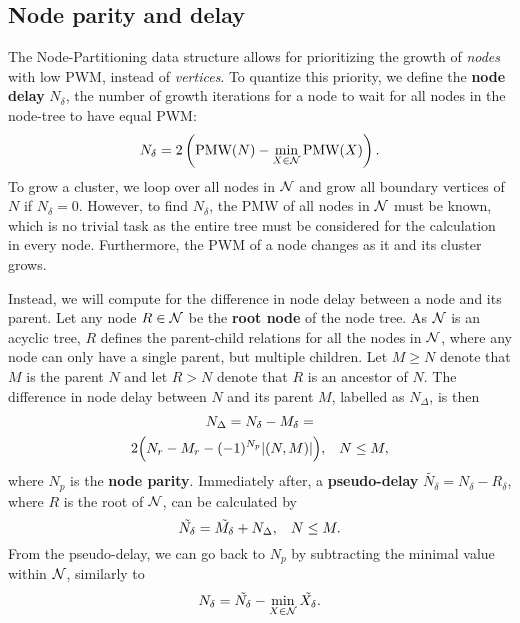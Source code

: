 \subsection{Node parity and delay}\label{sec:paritydelay}

The Node-Partitioning data structure allows for prioritizing the growth of \emph{nodes} with low PWM, instead of \emph{vertices}. To quantize this priority, we define the \textbf{node delay} $N_\delta$, the number of growth iterations for a node to wait for all nodes in the node-tree to have equal PWM: 
\begin{equation}
    N_\delta = 2\left(\text{PMW}(N) - \min_{X\in\mathcal{N}}{\text{PMW}(X)}\right).
\end{equation}
To grow a cluster, we loop over all nodes in $\mathcal{N}$ and grow all boundary vertices of $N$ if $N_\delta=0$. However, to find $N_\delta$, the PMW of all nodes in $\mathcal{N}$ must be known, which is no trivial task as the entire tree must be considered for the calculation in every node. Furthermore, the PWM of a node changes as it and its cluster grows. 

Instead, we will compute for the difference in node delay between a node and its parent. Let any node $R\in\mathcal{N}$ be the \textbf{root node} of the node tree. As $\mathcal{N}$ is an acyclic tree, $R$ defines the parent-child relations for all the nodes in $\mathcal{N}$, where any node can only have a single parent, but multiple children. Let $M\geq N$ denote that $M$ is the parent $N$ and let $R > N$ denote that $R$ is an ancestor of $N$. The difference in node delay between $N$ and its parent $M$, labelled as $N_\Delta$, is then
\begin{multline}\label{eq:pmwdif}
    N_\Delta = N_\delta - M_\delta = \\
    2\Big(N_r-M_r - (-1)^{N_p}\lvert(N,M)\rvert\Big), \hspace{.3cm} N\leq M,
\end{multline}
where $N_p$ is the \textbf{node parity}. Immediately after, a \textbf{pseudo-delay} $\tilde{N_\delta} = N_\delta - R_\delta$, where $R$ is the root of $\mathcal{N}$, can be calculated by
\begin{equation}\label{eq:pseudodelay}
    \tilde{N_\delta} = \tilde{M_\delta} + N_\Delta, \hspace{.3cm} N\leq M.
\end{equation}
From the pseudo-delay, we can go back to $N_p$ by subtracting the minimal value within $\mathcal{N}$, similarly to 
\begin{equation}\label{eq:delaypseudo}
    N_\delta = \tilde{N_\delta} - \min_{X \in \mathcal{N}}{\tilde{X_\delta}}. 
\end{equation}

